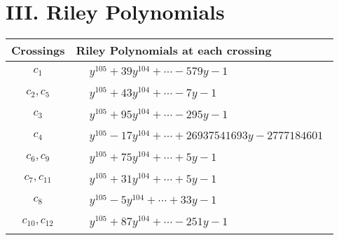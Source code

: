 \documentclass[1p]{elsarticle_modified}
\theoremstyle{definition}
\begin{document}
\centering \section*{ III. Riley Polynomials}
\begin{tabular}{m{50pt}|m{274pt}}
Crossings & \hspace{64pt}Riley Polynomials at each crossing \\
\hline $$\begin{aligned}c_{1}\end{aligned}$$&$\begin{aligned}
&y^{105}+39 y^{104}+\cdots-579 y-1
\end{aligned}$\\
\hline $$\begin{aligned}c_{2},c_{5}\end{aligned}$$&$\begin{aligned}
&y^{105}+43 y^{104}+\cdots-7 y-1
\end{aligned}$\\
\hline $$\begin{aligned}c_{3}\end{aligned}$$&$\begin{aligned}
&y^{105}+95 y^{104}+\cdots-295 y-1
\end{aligned}$\\
\hline $$\begin{aligned}c_{4}\end{aligned}$$&$\begin{aligned}
&y^{105}-17 y^{104}+\cdots+26937541693 y-2777184601
\end{aligned}$\\
\hline $$\begin{aligned}c_{6},c_{9}\end{aligned}$$&$\begin{aligned}
&y^{105}+75 y^{104}+\cdots+5 y-1
\end{aligned}$\\
\hline $$\begin{aligned}c_{7},c_{11}\end{aligned}$$&$\begin{aligned}
&y^{105}+31 y^{104}+\cdots+5 y-1
\end{aligned}$\\
\hline $$\begin{aligned}c_{8}\end{aligned}$$&$\begin{aligned}
&y^{105}-5 y^{104}+\cdots+33 y-1
\end{aligned}$\\
\hline $$\begin{aligned}c_{10},c_{12}\end{aligned}$$&$\begin{aligned}
&y^{105}+87 y^{104}+\cdots-251 y-1
\end{aligned}$\\
\hline
\end{tabular}
\vskip 2pc
\end{document}
